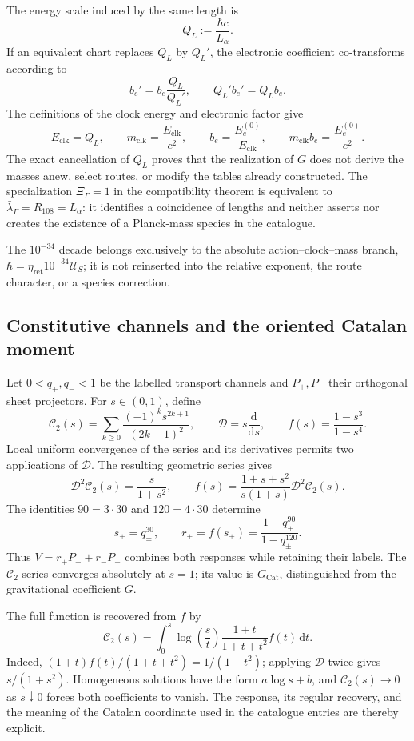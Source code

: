The energy scale induced by the same length is
\[
 Q_L:=\frac{\hbar c}{L_{\alpha}}.
 \tag{A.4}\label{eq:vi-cat-escala-q}
\]
If an equivalent chart replaces \(Q_L\) by \(Q_L'\), the electronic
coefficient co-transforms according to
\[
 b_e'=b_e\frac{Q_L}{Q_L'},\qquad Q_L'b_e'=Q_Lb_e .
 \tag{A.5}\label{eq:vi-cat-cotransformacion-be}
\]
The definitions of the clock energy and electronic factor give
\[
 E_{\mathrm{clk}}=Q_L,\qquad
 m_{\mathrm{clk}}=\frac{E_{\mathrm{clk}}}{c^2},\qquad
 b_e=\frac{E_e^{(0)}}{E_{\mathrm{clk}}},\qquad
 m_{\mathrm{clk}}b_e=\frac{E_e^{(0)}}{c^2}.
\]
The exact cancellation of \(Q_L\) proves that the realization of \(G\) does
not derive the masses anew, select routes, or modify the tables already
constructed. The specialization \(\Xi_\Gamma=1\) in the compatibility theorem
is equivalent to \(\bar\lambda_\Gamma=R_{108}=L_{\alpha}\): it identifies a
coincidence of lengths and neither asserts nor creates the existence of a
Planck-mass species in the catalogue.

The \(10^{-34}\) decade belongs exclusively to the absolute
action--clock--mass branch,
\(\hbar=\eta_{\mathrm{ret}}10^{-34}\mathcal U_S\); it is not reinserted into
the relative exponent, the route character, or a species correction.

\subsection{Constitutive channels and the oriented Catalan moment}
\label{sec:vi-catalogo-propietario-constitutivo}

Let \(0<q_+,q_-<1\) be the labelled transport channels and \(P_+,P_-\)
their orthogonal sheet projectors. For \(s\in(0,1)\), define
\[
 \mathcal C_2(s)=\sum_{k\geq0}
 \frac{(-1)^k s^{2k+1}}{(2k+1)^2},\qquad
 \mathcal D=s\frac{\mathrm d}{\mathrm ds},\qquad
 f(s)=\frac{1-s^3}{1-s^4}.
 \tag{A.6}\label{eq:vi-cat-constitutivas}
\]
Local uniform convergence of the series and its derivatives permits two
applications of \(\mathcal D\). The resulting geometric series gives
\[
 \mathcal D^2\mathcal C_2(s)=\frac{s}{1+s^2},\qquad
 f(s)=\frac{1+s+s^2}{s(1+s)}\mathcal D^2\mathcal C_2(s).
\]
The identities \(90=3\cdot30\) and \(120=4\cdot30\) determine
\[
 s_{\pm}=q_{\pm}^{30},\qquad
 r_{\pm}=f(s_{\pm})
 =\frac{1-q_{\pm}^{90}}{1-q_{\pm}^{120}}.
\]
Thus \(V=r_+P_++r_-P_-\) combines both responses while retaining their
labels. The \(\mathcal C_2\) series converges absolutely at \(s=1\); its
value is \(G_{\mathrm{Cat}}\), distinguished from the gravitational
coefficient \(G\).

The full function is recovered from \(f\) by
\[
 \mathcal C_2(s)=\int_0^s\log\!\left(\frac{s}{t}\right)
 \frac{1+t}{1+t+t^2}f(t)\,\mathrm dt.
\]
Indeed, \((1+t)f(t)/(1+t+t^2)=1/(1+t^2)\); applying \(\mathcal D\) twice
gives \(s/(1+s^2)\). Homogeneous solutions have the form \(a\log s+b\), and
\(\mathcal C_2(s)\to0\) as \(s\downarrow0\) forces both coefficients to
vanish. The response, its regular recovery, and the meaning of the Catalan
coordinate used in the catalogue entries are thereby explicit.
